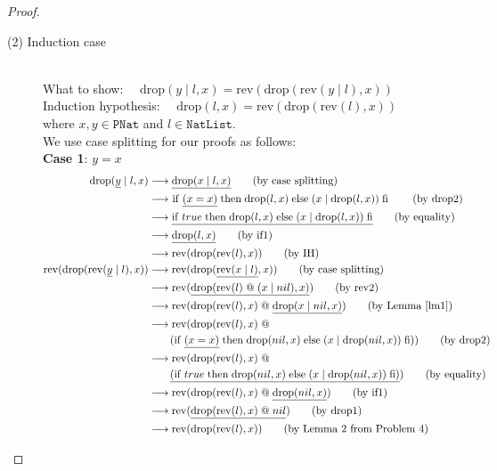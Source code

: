 \documentclass[12pt, a4paper]{article}
\newcommand{\rel}[1]{\mathrel{#1}}
\newcommand{\rmx}[1]{\mathrm{#1}}
\newcommand{\larrow}{\longrightarrow}
\newcommand{\under}{\underline}
\begin{document}
\begin{proof}
\begin{description}
\item[(2) Induction case]~\\
What to show: $\quad \rmx{drop}(y \rel{|} l, x) = \rmx{rev}(\rmx{drop}(\rmx{rev}(y \rel{|} l), x))$ \\
Induction hypothesis: $\quad \rmx{drop}(l, x) = \rmx{rev}(\rmx{drop}(\rmx{rev}(l), x))$  \\
where $x, y \in \mathtt{PNat}$ and $l \in \mathtt{NatList}$. \\
We use case splitting for our proofs as follows:\\
\textbf{Case 1}: $y = x$
\begin{align*}
\rmx{drop}(\under{y} \rel{|} l, x)
	&\larrow \under{\rmx{drop}(x \rel{|} l, x)} \tag{by case splitting} \\
	&\larrow\ \rel{\rmx{if}} \under{(x = x)} \rel{\rmx{then}} \rmx{drop}(l, x) \rel{\rmx{else}} (x \rel{|} \rmx{drop}(l, x)) \rel{\rmx{fi}} \tag{by drop2} \\
	&\larrow \under{\rel{\rmx{if}} true \rel{\rmx{then}} \rmx{drop}(l, x) \rel{\rmx{else}} (x \rel{|} \rmx{drop}(l, x)) \rel{\rmx{fi}}} \tag{by equality} \\
	&\larrow \under{\rmx{drop}(l, x)} \tag{by if1} \\
	&\larrow \rmx{rev}(\rmx{drop}(\rmx{rev}(l), x)) \tag{by IH} \\
\rmx{rev}(\rmx{drop}(\rmx{rev}(\under{y} \rel{|} l), x))
	&\larrow \rmx{rev}(\rmx{drop}(\under{\rmx{rev}(x \rel{|} l)}, x)) \tag{by case splitting} \\
	&\larrow \rmx{rev}(\under{\rmx{drop}(\rmx{rev}(l) \rel{@} (x \rel{|} nil), x)}) \tag{by rev2} \\
	&\larrow \rmx{rev}(\rmx{drop}(\rmx{rev}(l), x) \rel{@} \under{\rmx{drop}(x \rel{|} nil, x)}) \tag{by Lemma~\ref{lm1}} \\
	&\larrow \rmx{rev}(\rmx{drop}(\rmx{rev}(l), x) \rel{@} \\
	&\quad \quad (\rel{\rmx{if}} \under{(x = x)} \rel{\rmx{then}} \rmx{drop}(nil, x) \rel{\rmx{else}} (x \rel{|} \rmx{drop}(nil, x)) \rel{\rmx{fi}})) \tag{by drop2} \\
	&\larrow \rmx{rev}(\rmx{drop}(\rmx{rev}(l), x) \rel{@} \\
	&\quad \quad \under{(\rel{\rmx{if}} true \rel{\rmx{then}} \rmx{drop}(nil, x) \rel{\rmx{else}} (x \rel{|} \rmx{drop}(nil, x)) \rel{\rmx{fi}})}) \tag{by equality} \\
	&\larrow \rmx{rev}(\rmx{drop}(\rmx{rev}(l), x) \rel{@} \under{\rmx{drop}(nil, x)}) \tag{by if1} \\
	&\larrow \rmx{rev}(\under{\rmx{drop}(\rmx{rev}(l), x) \rel{@} nil}) \tag{by drop1} \\
	&\larrow \rmx{rev}(\rmx{drop}(\rmx{rev}(l), x)) \tag{by Lemma 2 from Problem 4} \\
\end{align*}


\end{description}
\end{proof}
\end{document}
